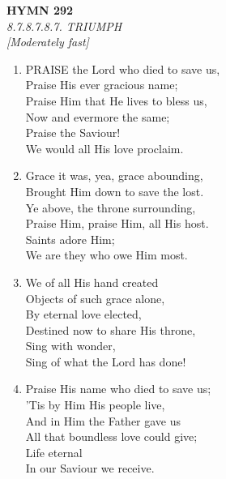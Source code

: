 \documentclass[11pt,a4paper]{article}
\begin{document}
\newpage
\begin{center}
    {\Large \textbf{HYMN 292}}
    \\
    \textit{8.7.8.7.8.7. TRIUMPH}
    \\
    \textit{\small [Moderately fast]}
\end{center}
\vspace{1em}

\begin{enumerate}
    \item PRAISE the Lord who died to save us, \\
        Praise His ever gracious name; \\
        Praise Him that He lives to bless us, \\
        Now and evermore the same; \\
        Praise the Saviour! \\
        We would all His love proclaim.

    \item Grace it was, yea, grace abounding, \\
        Brought Him down to save the lost. \\
        Ye above, the throne surrounding, \\
        Praise Him, praise Him, all His host. \\
        Saints adore Him; \\
        We are they who owe Him most.

    \item We of all His hand created \\
        Objects of such grace alone, \\
        By eternal love elected, \\
        Destined now to share His throne, \\
        Sing with wonder, \\
        Sing of what the Lord has done!

    \item Praise His name who died to save us; \\
        'Tis by Him His people live, \\
        And in Him the Father gave us \\
        All that boundless love could give; \\
        Life eternal \\
        In our Saviour we receive.

\end{enumerate}
\end{document}
